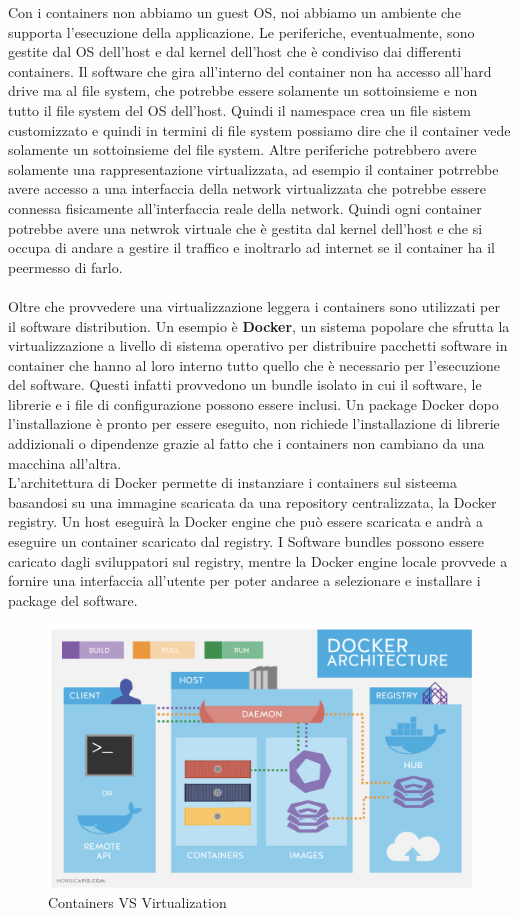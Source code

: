 \documentclass{article}
\begin{document}
Con i containers non abbiamo un guest OS, noi abbiamo un ambiente che supporta l'esecuzione della applicazione. Le periferiche, eventualmente, sono gestite dal OS dell'host e dal kernel dell'host che è condiviso dai differenti containers. Il software che gira all'interno del container non ha accesso all'hard drive ma al file system, che potrebbe essere solamente un sottoinsieme e non tutto il file system del OS dell'host. Quindi il namespace crea un file sistem customizzato e quindi in termini di file system possiamo dire che il container vede solamente un sottoinsieme del file system. Altre periferiche potrebbero avere solamente una rappresentazione virtualizzata, ad esempio il container potrrebbe avere accesso a una interfaccia della network virtualizzata che potrebbe essere connessa fisicamente all'interfaccia reale della network. Quindi ogni container potrebbe avere una netwrok virtuale che è gestita dal kernel dell'host e che si occupa di andare a gestire il traffico e inoltrarlo ad internet se il container ha il peermesso di farlo.
\\ \\
Oltre che provvedere una virtualizzazione leggera i containers sono utilizzati per il software distribution. Un esempio è \textbf{Docker}, un sistema popolare che sfrutta la virtualizzazione a livello di sistema operativo per distribuire pacchetti software in container che hanno al loro interno tutto quello che è necessario per l'esecuzione del software. Questi infatti provvedono un bundle isolato in cui il software, le librerie e i file di configurazione possono essere inclusi. Un package Docker dopo l'installazione è pronto per essere eseguito, non richiede l'installazione di librerie addizionali o dipendenze grazie al fatto che i containers non cambiano da una macchina all'altra. \\
L'architettura di Docker permette di instanziare i containers sul sisteema basandosi su una immagine scaricata da una repository centralizzata, la Docker registry. Un host eseguirà la Docker engine che può essere scaricata e andrà a eseguire un container scaricato dal registry. I Software bundles possono essere caricato dagli sviluppatori sul registry, mentre la Docker engine locale provvede a fornire una interfaccia all'utente per poter andaree a selezionare e installare i package del software.
\begin{figure}[H]
\centering
\includegraphics[scale=0.5]{img/Virt_tech/23.png}
\caption{Containers VS Virtualization}
\end{figure}
\end{document}

